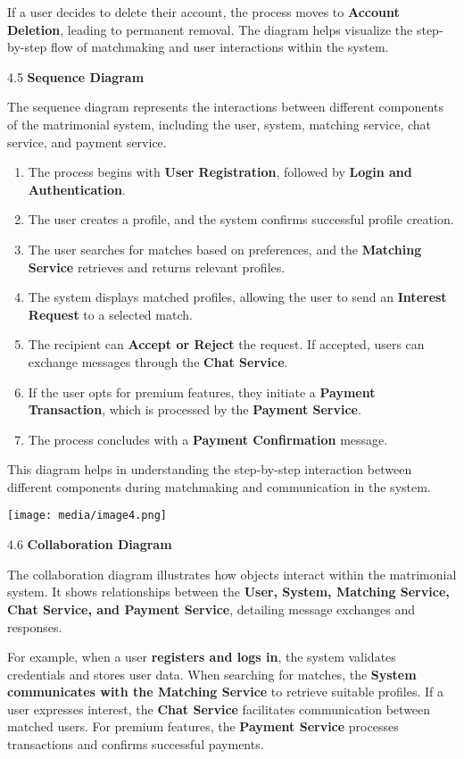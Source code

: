 If a user decides to delete their account, the process moves to
\textbf{Account Deletion}, leading to permanent removal. The diagram
helps visualize the step-by-step flow of matchmaking and user
interactions within the system.

4.5 \textbf{Sequence Diagram}

The sequence diagram represents the interactions between different
components of the matrimonial system, including the user, system,
matching service, chat service, and payment service.

\begin{enumerate}
\def\labelenumi{\arabic{enumi}.}
\item
  The process begins with \textbf{User Registration}, followed by
  \textbf{Login and Authentication}.
\item
  The user creates a profile, and the system confirms successful profile
  creation.
\item
  The user searches for matches based on preferences, and the
  \textbf{Matching Service} retrieves and returns relevant profiles.
\item
  The system displays matched profiles, allowing the user to send an
  \textbf{Interest Request} to a selected match.
\item
  The recipient can \textbf{Accept or Reject} the request. If accepted,
  users can exchange messages through the \textbf{Chat Service}.
\item
  If the user opts for premium features, they initiate a \textbf{Payment
  Transaction}, which is processed by the \textbf{Payment Service}.
\item
  The process concludes with a \textbf{Payment Confirmation} message.
\end{enumerate}

This diagram helps in understanding the step-by-step interaction between
different components during matchmaking and communication in the system.

\texttt{[image: media/image4.png]}

4.6 \textbf{Collaboration Diagram}

The collaboration diagram illustrates how objects interact within the
matrimonial system. It shows relationships between the \textbf{User,
System, Matching Service, Chat Service, and Payment Service}, detailing
message exchanges and responses.

For example, when a user \textbf{registers and logs in}, the system
validates credentials and stores user data. When searching for matches,
the \textbf{System communicates with the Matching Service} to retrieve
suitable profiles. If a user expresses interest, the \textbf{Chat
Service} facilitates communication between matched users. For premium
features, the \textbf{Payment Service} processes transactions and
confirms successful payments.

